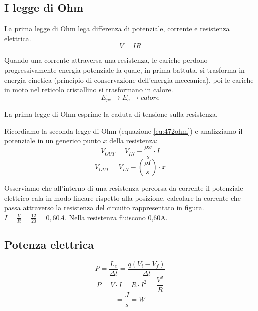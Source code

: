 \subsection{I legge di Ohm}
    \par La prima legge di Ohm lega differenza di potenziale, corrente e resistenza elettrica.
    \begin{equation}V=IR\end{equation}
    \par Quando una corrente attraversa una resistenza, le cariche perdono progressivamente energia potenziale la quale, in prima battuta, si trasforma in energia cinetica (principio di conservazione dell'energia meccanica), poi le cariche in moto nel reticolo cristallino si trasformano in calore.
    \begin{equation*}
        E_{pe}\rightarrow E_c \rightarrow calore
    \end{equation*}
    \par La prima legge di Ohm esprime la caduta di tensione sulla resistenza.
    \par Ricordiamo la seconda legge di Ohm (equazione \ref{eq:472ohm}) e analizziamo il potenziale in un generico punto $x$ della resistenza:
    \begin{equation*}
        V_{OUT}=V_{IN}-\frac{\rho x}{s}\cdot I
    \end{equation*}
    \begin{equation*}
        V_{OUT}=V_{IN}-\left(\frac{\rho I}{s}\right)\cdot x
    \end{equation*}
    \par Osserviamo che all'interno di una resistenza percorsa da corrente il potenziale elettrico cala in modo lineare rispetto alla posizione.
    \esempio calcolare la corrente che passa attraverso la resistenza del circuito rappresentato in figura.
    $I=\frac{V}{R}=\frac{12}{20}=0,60A$. Nella resistenza fluiscono 0,60A.
\subsection{Potenza elettrica}
    \begin{equation*}
        P=\frac{L_e}{\Delta t}=\frac{q(V_i-V_f)}{\Delta t}
    \end{equation*}
    \begin{equation}
        P=V\cdot I=R\cdot I^2 = \frac{V^2}{R}
    \end{equation}
    \begin{equation*}
        [P]=\frac{J}{s}=W
    \end{equation*}

